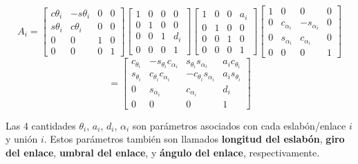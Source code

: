 \documentclass[a4paper, 12pt]{article}
\begin{document}
\begin{equation*}
    A_i=
    \begin{bmatrix}
        c\theta_i & -s\theta_i & 0 & 0 \\
        s\theta_i & c\theta_i  & 0 & 0 \\
        0         & 0          & 1 & 0 \\
        0         & 0          & 0 & 1
    \end{bmatrix}
    \begin{bmatrix}
        1 & 0 & 0 & 0   \\
        0 & 1 & 0 & 0   \\
        0 & 0 & 1 & d_i \\
        0 & 0 & 0 & 1
    \end{bmatrix}
    \begin{bmatrix}
        1 & 0 & 0 & a_i \\
        0 & 1 & 0 & 0   \\
        0 & 0 & 1 & 0   \\
        0 & 0 & 0 & 1
    \end{bmatrix}
    \begin{bmatrix}
        1 & 0            & 0             & 0 \\
        0 & c_{\alpha_i} & -s_{\alpha_i} & 0 \\
        0 & s_{\alpha_i} & c_{\alpha_i}  & 0 \\
        0 & 0            & 0             & 1
    \end{bmatrix}
\end{equation*}
\begin{equation*}
    =
    \begin{bmatrix}
        c_{\theta_i} & -s_{\theta_i}c_{\alpha_i} & s_{\theta_i}s_{\alpha_i}  & a_ic_{\theta_i} \\
        s_{\theta_i} & c_{\theta_i}c_{\alpha_i}  & -c_{\theta_i}s_{\alpha_i} & a_is_{\theta_i} \\
        0            & s_{\alpha_i}              & c_{\alpha_i}              & d_i             \\
        0            & 0                         & 0                         & 1
    \end{bmatrix}
\end{equation*}

Las 4 cantidades \(\theta_i\), \(a_i\), \(d_i\), \(\alpha_i\) son parámetros
asociados con cada eslabón/enlace \(i\) y unión \(i\). Estos parámetros
también son llamados \textbf{longitud del eslabón}, \textbf{giro del enlace},
\textbf{umbral del enlace}, y \textbf{ángulo del enlace}, respectivamente.
\end{document}
